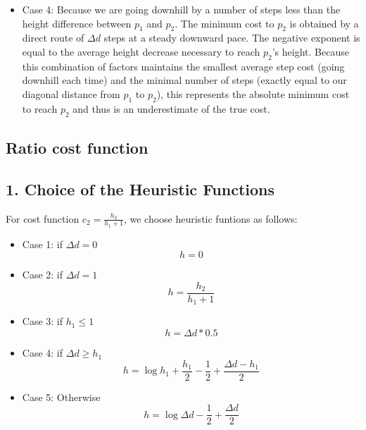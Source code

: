 \documentclass[11pt]{article}  %
\begin{document}
\begin{itemize}
\item Case 4:
Because we are going downhill by a number of steps less than the height difference between $p_1$ and $p_2$. The minimum cost to $p_2$ is obtained by a direct route of $\Delta d$ steps at a steady downward pace. The negative exponent is equal to the average height decrease necessary to reach $p_2$'s height. Because this combination of factors maintains the smallest average step cost (going downhill each time) and the minimal number of steps (exactly equal to our diagonal distance from $p_1$ to $p_2$), this represents the absolute minimum cost to reach $p_2$ and thus is an underestimate of the true cost.

\end{itemize}


\subsection*{Ratio cost function}
\subsection*{1. Choice of the Heuristic Functions}
For cost function $c_{2} = \frac{h_{2}}{h_{1} + 1}$, we choose heuristic funtions as follows:
\begin{itemize}
\item Case 1: if $\Delta d = 0$
\begin{equation}
h = 0
\end{equation}
\item Case 2: if $\Delta d = 1$
\begin{equation}
h=\frac{h_2}{h_1+1}
\end{equation}
\item Case 3: if $h_1 \le 1$
\begin{equation}
h=\Delta d * 0.5
\end{equation}
\item Case 4: if $\Delta d \ge h_1$
\begin{equation}
h= \log h_1 + \frac{h_1}{2} - \frac{1}{2} + \frac{\Delta d - h_1}{2}
\end{equation}
\item Case 5: Otherwise
\begin{equation}
h= \log \Delta d - \frac{1}{2} + \frac{\Delta d}{2}
\end{equation}


\end{itemize}
\end{document}

